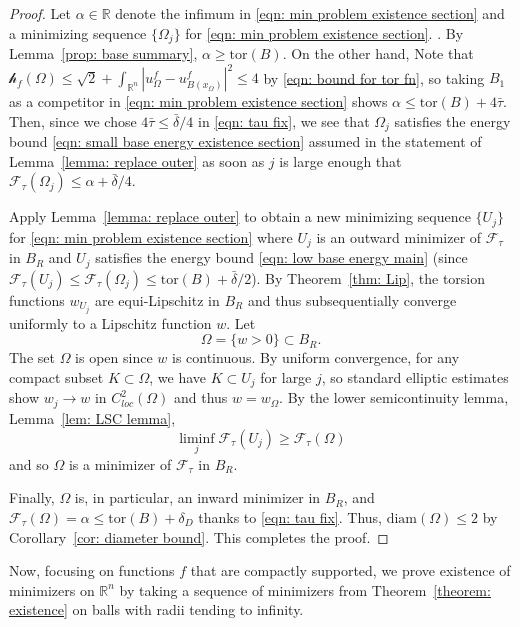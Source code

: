 \documentclass[10pt, reqno]{amsart}
\numberwithin{equation}{section}
\def\R{{\mathbb R}}
\def\W{\Omega}
\def\tor{\mathrm{tor}}
\def\err{\tau}
\def\Ep{\mathcal{F}_{\err}}
\def\nl{\mathscr{h}_f}
\def\ccdel{\bar{\delta}}
\begin{document}
 \begin{proof}
 Let $\alpha \in \R$ denote the infimum in \eqref{eqn: min problem existence section} and a minimizing sequence $\{\W_j\}$ for \eqref{eqn: min problem existence section}. 
 . By Lemma~\ref{prop: base summary}, $\alpha \geq \tor(B)$. On the other hand,  Note that $\nl(\W) \leq \sqrt{2}+ \int_{\R^n} |u_\W^f - u_{B(x_\W)}^f|^2 \leq 4$ by \eqref{eqn: bound for tor fn}, so taking $B_1$ as a competitor in \eqref{eqn: min problem existence section} shows $\alpha \leq \tor(B) +4\bar{\tau}.$
Then, since we chose $4\bar{\tau} \leq \bar{\delta}/4$ in \eqref{eqn: tau fix}, 
  we see that $\W_j$ satisfies the energy bound \eqref{eqn: small base energy existence section} assumed in the statement of Lemma~\ref{lemma: replace outer} as soon as $j$ is large enough that $\Ep(\W_j) \leq \alpha + \bar{\delta}/4$.

 
 Apply Lemma~\ref{lemma: replace outer} to obtain a new minimizing sequence $\{U_j\}$ for \eqref{eqn: min problem existence section} where $U_j$ is an outward minimizer of $\Ep$ in $B_R$ and $U_j$  satisfies the energy bound \eqref{eqn: low base energy main} (since $\Ep(U_j)\leq \Ep(\W_j)\leq \tor(B)+\ccdel/2$).
 By Theorem~\ref{thm: Lip}, the torsion functions $w_{U_j}$ are equi-Lipschitz in $B_R$ and thus subsequentially converge uniformly to a Lipschitz function $w$. Let 
 \[
 \W = \{ w>0\} \subset B_R.
 \]
 The set $\W$ is open since $w$ is continuous.
By uniform convergence, for any compact subset $K\subset \W$, we have $K \subset U_j$ for large $j$, so standard elliptic estimates show  $w_j \to w$ in $C^2_{loc}(\W)$ and thus $w=w_\W$. 
By the lower semicontinuity lemma, Lemma~\ref{lem: LSC lemma}, 
\[
\liminf_{j}\Ep(U_j) \geq \Ep(\W)
\]
and so  $\W$ is a minimizer of $\Ep$ in $B_R$. 

Finally, $\W$ is, in particular, an inward minimizer in $B_R$, and $\Ep(\W) = \alpha \leq \tor(B) +  \delta_D$ thanks to  \eqref{eqn: tau fix}. Thus, $\text{diam}(\W)\leq 2$ by  Corollary~\ref{cor: diameter bound}. This completes the proof.
    \end{proof}
%
%
%
%
%
%
Now, focusing on functions $f$ that are compactly supported, we prove existence of minimizers on $\R^n$ by taking a sequence of minimizers from Theorem~\ref{theorem: existence} on balls with radii tending to infinity. 
%
%
%
\end{document}
